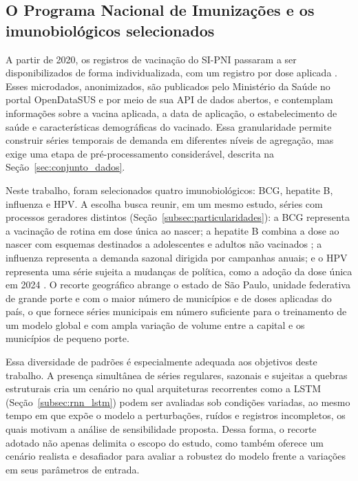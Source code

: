 \documentclass[
    12pt,
    openright,
    oneside,
    a4paper,
    english,
    brazil
]{abntex2}
\begin{document}
\subsection{O Programa Nacional de Imunizações e os imunobiológicos selecionados}
\label{subsec:pni}

A partir de 2020, os registros de vacinação do SI-PNI passaram a ser disponibilizados de forma individualizada, com um registro por dose aplicada \cite{BrasilPNIDados}. Esses microdados, anonimizados, são publicados pelo Ministério da Saúde no portal OpenDataSUS e por meio de sua API de dados abertos, e contemplam informações sobre a vacina aplicada, a data de aplicação, o estabelecimento de saúde e características demográficas do vacinado. Essa granularidade permite construir séries temporais de demanda em diferentes níveis de agregação, mas exige uma etapa de pré-processamento considerável, descrita na Seção~\ref{sec:conjunto_dados}.

Neste trabalho, foram selecionados quatro imunobiológicos: BCG, hepatite B, influenza e HPV. A escolha busca reunir, em um mesmo estudo, séries com processos geradores distintos (Seção~\ref{subsec:particularidades}): a BCG representa a vacinação de rotina em dose única ao nascer; a hepatite B combina a dose ao nascer com esquemas destinados a adolescentes e adultos não vacinados \cite{BrasilCalendario2026}; a influenza representa a demanda sazonal dirigida por campanhas anuais; e o HPV representa uma série sujeita a mudanças de política, como a adoção da dose única em 2024 \cite{BrasilNT412024}. O recorte geográfico abrange o estado de São Paulo, unidade federativa de grande porte e com o maior número de municípios e de doses aplicadas do país, o que fornece séries municipais em número suficiente para o treinamento de um modelo global e com ampla variação de volume entre a capital e os municípios de pequeno porte.

Essa diversidade de padrões é especialmente adequada aos objetivos deste trabalho. A presença simultânea de séries regulares, sazonais e sujeitas a quebras estruturais cria um cenário no qual arquiteturas recorrentes como a LSTM (Seção~\ref{subsec:rnn_lstm}) podem ser avaliadas sob condições variadas, ao mesmo tempo em que expõe o modelo a perturbações, ruídos e registros incompletos, os quais motivam a análise de sensibilidade proposta. Dessa forma, o recorte adotado não apenas delimita o escopo do estudo, como também oferece um cenário realista e desafiador para avaliar a robustez do modelo frente a variações em seus parâmetros de entrada.
\end{document}
